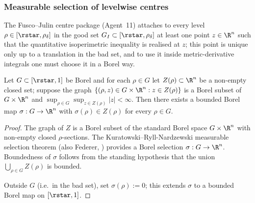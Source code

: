 \subsubsection{Measurable selection of levelwise centres}
\label{ssec:meas-sel}

The Fusco--Julin centre package (Agent~11) attaches to every level
$\rho\in[\rstar,\rho_\delta]$ in the good set $G_I\subset
[\rstar,\rho_\delta]$ at least one point $z\in\R^n$ such that the
quantitative isoperimetric inequality is realised at $z$; this point
is unique only up to a translation in the bad set, and to use it
inside metric-derivative integrals one must choose it in a Borel way.

\begin{lemma}
\label{lem:borel-selection}
Let $G\subset[\rstar,1]$ be Borel and for each $\rho\in G$ let
$Z(\rho)\subset\R^n$ be a non-empty closed set; suppose the
graph $\{(\rho,z)\in G\times\R^n:z\in Z(\rho)\}$ is a Borel subset of
$G\times\R^n$ and $\sup_{\rho\in G}\sup_{z\in Z(\rho)}|z|<\infty$.
Then there exists a bounded Borel map $\sigma:G\to\R^n$ with
$\sigma(\rho)\in Z(\rho)$ for every $\rho\in G$.
\end{lemma}

\begin{proof}
The graph of $Z$ is a Borel subset of the standard Borel space
$G\times\R^n$ with non-empty closed $\rho$-sections.  The
Kuratowski--Ryll-Nardzewski measurable selection theorem
\cite[Thm.~III.6 and Thm.~III.8]{CastaingValadier} (also Federer,
\cite[\S 2.13]{Federer1969}) provides a Borel selection
$\sigma:G\to\R^n$.  Boundedness of $\sigma$ follows from the standing
hypothesis that the union $\bigcup_{\rho\in G}Z(\rho)$ is bounded.

Outside $G$ (i.e.\ in the bad set), set $\sigma(\rho):=0$; this
extends $\sigma$ to a bounded Borel map on $[\rstar,1]$.
\end{proof}

